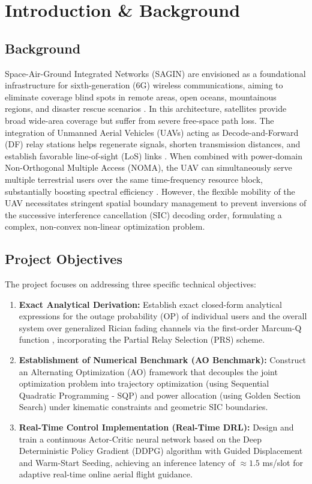 \section{Introduction \& Background}
\label{sec:intro_background}

\subsection*{Background}

Space-Air-Ground Integrated Networks (SAGIN) are envisioned as a foundational infrastructure for sixth-generation (6G) wireless communications, aiming to eliminate coverage blind spots in remote areas, open oceans, mountainous regions, and disaster rescue scenarios \cite{liu2018space, zeng2019accessing}. In this architecture, satellites provide broad wide-area coverage but suffer from severe free-space path loss. The integration of Unmanned Aerial Vehicles (UAVs) acting as Decode-and-Forward (DF) relay stations helps regenerate signals, shorten transmission distances, and establish favorable line-of-sight (LoS) links \cite{wu2018joint}. When combined with power-domain Non-Orthogonal Multiple Access (NOMA), the UAV can simultaneously serve multiple terrestrial users over the same time-frequency resource block, substantially boosting spectral efficiency \cite{ding2017application}. However, the flexible mobility of the UAV necessitates stringent spatial boundary management to prevent inversions of the successive interference cancellation (SIC) decoding order, formulating a complex, non-convex non-linear optimization problem.

\subsection*{Project Objectives}

The project focuses on addressing three specific technical objectives:
\begin{enumerate}
    \item \textbf{Exact Analytical Derivation:} Establish exact closed-form analytical expressions for the outage probability (OP) of individual users and the overall system over generalized Rician fading channels via the first-order Marcum-Q function \cite{simon2005digital}, incorporating the Partial Relay Selection (PRS) scheme.
    \item \textbf{Establishment of Numerical Benchmark (AO Benchmark):} Construct an Alternating Optimization (AO) framework that decouples the joint optimization problem into trajectory optimization (using Sequential Quadratic Programming - SQP) and power allocation (using Golden Section Search) under kinematic constraints and geometric SIC boundaries.
    \item \textbf{Real-Time Control Implementation (Real-Time DRL):} Design and train a continuous Actor-Critic neural network based on the Deep Deterministic Policy Gradient (DDPG) algorithm \cite{lillicrap2015continuous} with Guided Displacement and Warm-Start Seeding, achieving an inference latency of $\approx 1.5$ ms/slot for adaptive real-time online aerial flight guidance.
\end{enumerate}
